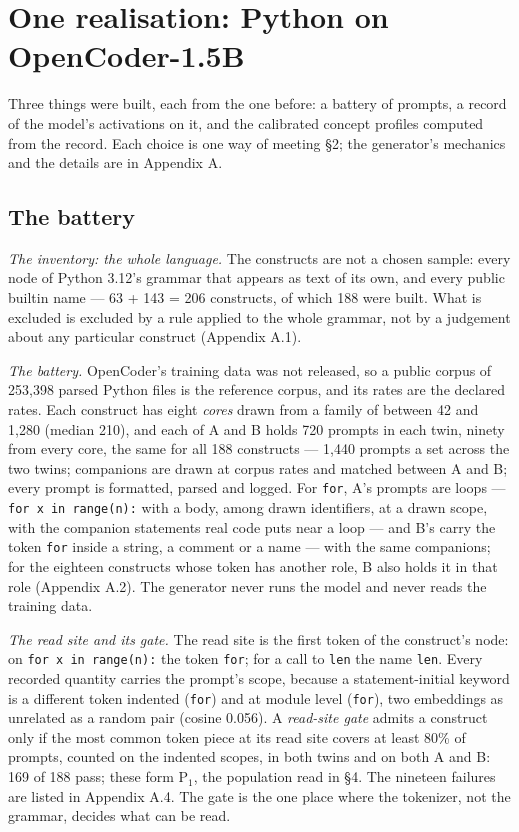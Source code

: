 \documentclass{article}
\begin{document}
\section{One realisation: Python on OpenCoder-1.5B}

Three things were built, each from the one before: a battery of prompts, a record of the model's activations on it, and the calibrated concept profiles computed from the record. Each choice is one way of meeting \S2; the generator's mechanics and the details are in Appendix A.

\subsection{The battery}

\emph{The inventory: the whole language.} The constructs are not a chosen sample: every node of Python 3.12's grammar that appears as text of its own, and every public builtin name --- 63 + 143 = 206 constructs, of which 188 were built. What is excluded is excluded by a rule applied to the whole grammar, not by a judgement about any particular construct (Appendix A.1).

\emph{The battery.} OpenCoder's training data was not released, so a public corpus of 253,398 parsed Python files is the reference corpus, and its rates are the declared rates. Each construct has eight \emph{cores} drawn from a family of between 42 and 1,280 (median 210), and each of A and B holds 720 prompts in each twin, ninety from every core, the same for all 188 constructs --- 1,440 prompts a set across the two twins; companions are drawn at corpus rates and matched between A and B; every prompt is formatted, parsed and logged. For \texttt{for}, A's prompts are loops --- \texttt{for x in range(n):} with a body, among drawn identifiers, at a drawn scope, with the companion statements real code puts near a loop --- and B's carry the token \texttt{for} inside a string, a comment or a name --- with the same companions; for the eighteen constructs whose token has another role, B also holds it in that role (Appendix A.2). The generator never runs the model and never reads the training data.

\emph{The read site and its gate.} The read site is the first token of the construct's node: on \texttt{for x in range(n):} the token \texttt{for}; for a call to \texttt{len} the name \texttt{len}. Every recorded quantity carries the prompt's scope, because a statement-initial keyword is a different token indented (\texttt{\textvisiblespace{}for}) and at module level (\texttt{for}), two embeddings as unrelated as a random pair (cosine 0.056). A \emph{read-site gate} admits a construct only if the most common token piece at its read site covers at least 80\% of prompts, counted on the indented scopes, in both twins and on both A and B: 169 of 188 pass; these form P$_1$, the population read in \S4. The nineteen failures are listed in Appendix A.4. The gate is the one place where the tokenizer, not the grammar, decides what can be read.
\end{document}
